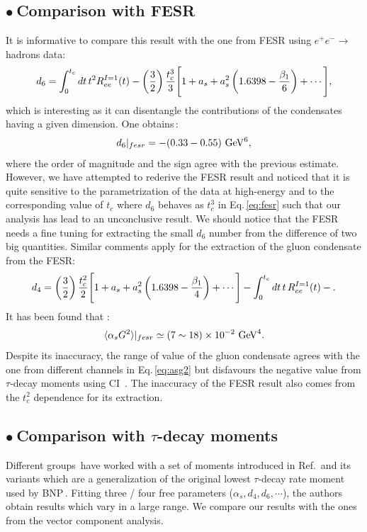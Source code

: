 \documentclass[review]{elsarticle}
\def\beq{\begin{equation}}
\def\eeq{\end{equation}}
\def\ga{\left(}
\def\dr{\right)}
\def\la{\langle}
\def\ra{\rangle}
\def\b{$\bullet~$}
\begin{document}
\subsection*{\b Comparison with FESR\,\cite{FESR}}
 It is informative to compare this result with the one from FESR using $e^+e^-\to$ hadrons data:
  \beq
 d_6=\int_0^{t_c} dt \, t^2  R^{I=1}_{ee}(t)-\ga\frac{3}{2}\dr\frac{t_c^3}{3}\Bigg{[} 1+a_s+a_s^2\ga 1.6398-\frac{\beta_1}{6}\dr+\cdots\Bigg{]},
  \label{eq:d6fesr}
  \eeq
  which is interesting as it can disentangle the contributions of the condensates having a given dimension. One obtains\,\cite{FESR}:
 \beq
 d_6\vert_{fesr} = -(0.33-0.55)~{\rm GeV^6},
 \eeq
 where the order of magnitude and the sign agree with the previous estimate. However, we have attempted to rederive the FESR result and noticed that it is quite sensitive to the parametrization of the data at high-energy and to the corresponding value of $t_c$ where $d_6$ behaves as $t_c^3$ in Eq.\,\ref{eq:fesr} such that our analysis has lead to an unconclusive result. We should notice that the FESR needs a fine tuning for  extracting the small $d_6$ number from the difference of two big quantities.  Similar comments apply for the extraction of the gluon condensate from the FESR:
 \beq
 d_4=\ga\frac{3}{2}\dr\frac{t_c^2}{2}\Bigg{[} 1+a_s+a_s^2\ga 1.6398-\frac{\beta_1}{4}\dr+\cdots\Bigg{]}-\int_0^{t_c} dt \, t \, R^{I=1}_{ee}(t)-.
  \eeq
 It has been found that\,\cite{FESR}\,:
 \beq
 \la\alpha_s G^2\ra\vert_{fesr}\simeq (7\sim 18)\times 10^{-2}~{\rm GeV}^4.
 \eeq 
  Despite its inaccuracy, the range of value of the gluon condensate agrees with the one from different  channels in Eq.\,\ref{eq:asg2} but disfavours the negative value from $\tau$-decay moments using CI \,\cite{DAVIER,PICH1}. The inaccuracy of the FESR result also comes from the $t_c^2$ dependence for its extraction.
  \subsection*{\b Comparison with $\tau$-decay moments}
   Different groups\,\cite{BOITO,ALEPH,OPAL,PICH1,PICH2,DAVIER} have  worked  with a set of moments introduced  in Ref.\,\cite{LEDI}  and its variants which are a generalization of the original lowest $\tau$-decay rate moment used by BNP\,\cite{BNP2,BNP}.  
    Fitting   three / four free  parameters ($\alpha_s, d_4,d_6,\cdots$), the authors obtain results which vary in a large range. We compare our results with the ones  from the vector component analysis. 
\end{document}
